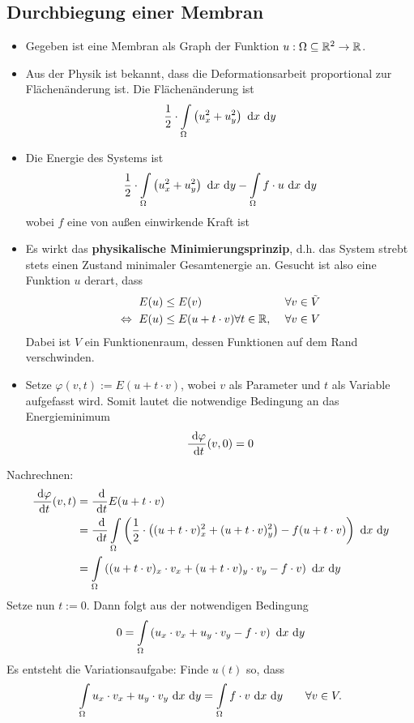 \subsection*{Durchbiegung einer Membran}
\begin{itemize}
\item Gegeben ist eine Membran als Graph der Funktion $u:\Omega\subseteq\mathbb{R}^2\to\mathbb{R}$.
\item Aus der Physik ist bekannt, dass die Deformationsarbeit proportional zur Flächenänderung ist. Die Flächenänderung ist
\begin{align*}
\frac{1}{2}\cdot\int\limits_\Omega\left(u^2_x+u_y^2\right)\text{ d} x\text{ d} y
\end{align*}
\item Die Energie des Systems ist 
\begin{align*}
\frac{1}{2}\cdot\int\limits_\Omega\left(u^2_x+u_y^2\right)\text{ d} x\text{ d} y-\int\limits_\Omega f\cdot u\text{ d} x\text{ d} y
\end{align*}
wobei $f$ eine von außen einwirkende Kraft ist
\item Es wirkt das \textbf{physikalische Minimierungsprinzip}, d.h. das System strebt stets einen Zustand minimaler Gesamtenergie an. Gesucht ist also eine Funktion $u$ derart, dass 
\begin{align*}
	E(u)&\leq E(v)&\forall v\in\tilde{V}\\
	\Leftrightarrow ~ E(u)&\leq E(u+t\cdot v)\forall t\in\mathbb{R},~&\forall v\in V
\end{align*}
Dabei ist $V$ ein Funktionenraum, dessen Funktionen auf dem Rand verschwinden.
\item Setze $\varphi(v,t):=E(u+t\cdot v)$, wobei $v$ als Parameter und $t$ als Variable aufgefasst wird. Somit lautet die notwendige Bedingung an das Energieminimum
\begin{align*}
\frac{\text{ d}\varphi}{\text{ d} t}(v,0)=0
\end{align*}
\end{itemize}
Nachrechnen:
\begin{align*}
\frac{\text{ d}\varphi}{\text{ d} t}(v,t)
&=\frac{\text{ d}}{\text{ d} t}E(u+t\cdot v)\\
&=\frac{\text{ d}}{\text{ d} t}\int\limits_\Omega\left(\frac{1}{2}\cdot\left((u+t\cdot v)_x^2+(u+t\cdot v)_y^2\right)-f(u+t\cdot v)\right)\text{ d} x\text{ d} y\\
&=\int\limits_\Omega\left((u+t\cdot v)_x\cdot v_x+(u+t\cdot v)_y\cdot v_y-f\cdot v\right)\text{ d} x\text{ d} y
\end{align*}
Setze nun $t:=0$. Dann folgt aus der notwendigen Bedingung
\begin{align*}
0=\int\limits_\Omega\left(u_x\cdot v_x+u_y\cdot v_y-f\cdot v\right)\text{ d} x\text{ d} y
\end{align*}
Es entsteht die Variationsaufgabe: Finde $u(t)$ so, dass 
\begin{align*}
\int\limits_\Omega u_x\cdot v_x+u_y\cdot v_y\text{ d} x\text{ d} y=\int\limits_\Omega f\cdot v\text{ d} x\text{ d} y\qquad\forall v\in V.
\end{align*}

